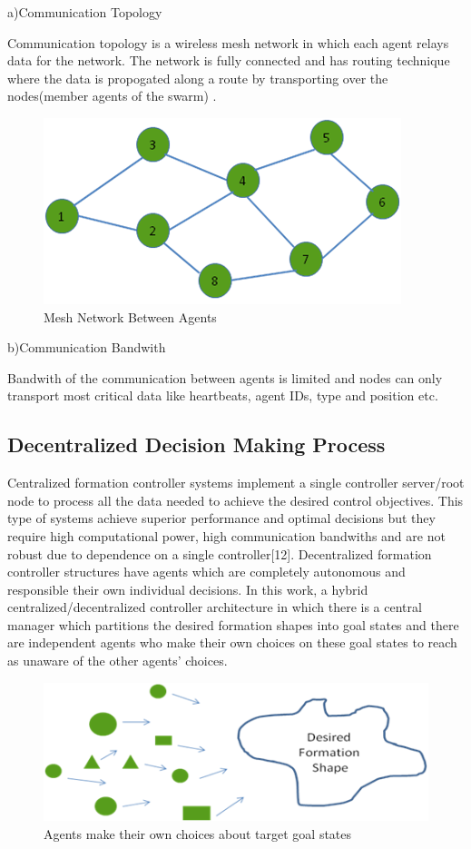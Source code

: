 a)Communication Topology


Communication topology is a wireless mesh network in which each agent relays data for the network. The network is fully connected and has routing technique where the data is propogated along a route by transporting over the nodes(member agents of the swarm) . 

\begin{figure}[H]
	\caption{Mesh Network Between Agents}
	\centering
	\includegraphics[scale = 1]{mesh}
\end{figure} 

b)Communication Bandwith

Bandwith of the communication between agents is limited and nodes can only transport most critical data like heartbeats, agent IDs, type and position etc. 



\subsection{ Decentralized Decision Making Process}

Centralized formation controller systems implement a single controller  server/root node
to process all the data needed to achieve the desired control objectives. This type of systems achieve superior performance and optimal decisions  but they require high computational power, high communication bandwiths and are not robust due to dependence on a single controller[12]. Decentralized formation controller structures have agents which are completely autonomous and responsible their own individual decisions. In this work, a hybrid centralized/decentralized controller architecture in which there is a central manager which partitions the desired formation shapes into goal states and there are independent agents who make their own choices on these goal states to reach as unaware of the other agents' choices. 


\begin{figure}[H]
	\caption{Agents make their own choices about target goal states}
	\centering
	\includegraphics[scale = 1]{decentralized}
\end{figure} 


